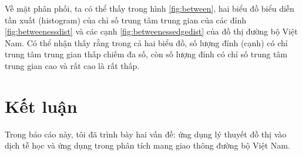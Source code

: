 \documentclass[14pt, oneside, a4paper, openany]{scrartcl}
\begin{document}
Về mặt phân phối, ta có thể thấy trong hình \ref{fig:between}, hai biểu đồ biểu diễn tần xuất (histogram) của chỉ số trung tâm trung gian của các đỉnh \ref{fig:betweenessdist} và các cạnh \ref{fig:betweenessedgedist} của đồ thị đường bộ Việt Nam. Có thể nhận thấy rằng trong cả hai biểu đồ, số lượng đỉnh (cạnh) có chỉ trung tâm trung gian thấp chiếm đa số, còn số lượng đỉnh có chỉ số trung tâm trung gian cao và rất cao là rất thấp.


\newpage
{}
\section{Kết luận}
Trong báo cáo này, tôi đã trình bày hai vấn đề: ứng dụng lý thuyết đồ thị vào dịch tễ học và ứng dụng trong phân tích mang giao thông đường bộ Việt Nam. 
\end{document}
